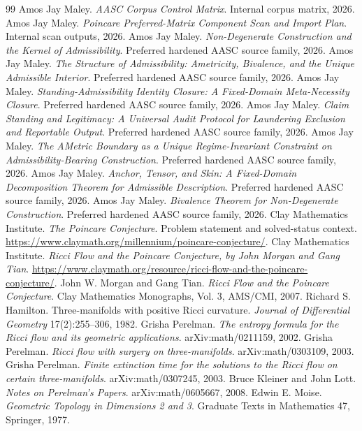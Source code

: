 \documentclass[11pt]{article}
\begin{document}
\begin{thebibliography}{99}
 Amos Jay Maley. \emph{AASC Corpus Control Matrix}. Internal corpus matrix, 2026.
 Amos Jay Maley. \emph{Poincare Preferred-Matrix Component Scan and Import Plan}. Internal scan outputs, 2026.
 Amos Jay Maley. \emph{Non-Degenerate Construction and the Kernel of Admissibility}. Preferred hardened AASC source family, 2026.
 Amos Jay Maley. \emph{The Structure of Admissibility: Ametricity, Bivalence, and the Unique Admissible Interior}. Preferred hardened AASC source family, 2026.
 Amos Jay Maley. \emph{Standing-Admissibility Identity Closure: A Fixed-Domain Meta-Necessity Closure}. Preferred hardened AASC source family, 2026.
 Amos Jay Maley. \emph{Claim Standing and Legitimacy: A Universal Audit Protocol for Laundering Exclusion and Reportable Output}. Preferred hardened AASC source family, 2026.
 Amos Jay Maley. \emph{The AMetric Boundary as a Unique Regime-Invariant Constraint on Admissibility-Bearing Construction}. Preferred hardened AASC source family, 2026.
 Amos Jay Maley. \emph{Anchor, Tensor, and Skin: A Fixed-Domain Decomposition Theorem for Admissible Description}. Preferred hardened AASC source family, 2026.
 Amos Jay Maley. \emph{Bivalence Theorem for Non-Degenerate Construction}. Preferred hardened AASC source family, 2026.
 Clay Mathematics Institute. \emph{The Poincare Conjecture}. Problem statement and solved-status context. \url{https://www.claymath.org/millennium/poincare-conjecture/}.
 Clay Mathematics Institute. \emph{Ricci Flow and the Poincare Conjecture, by John Morgan and Gang Tian}. \url{https://www.claymath.org/resource/ricci-flow-and-the-poincare-conjecture/}.
 John W. Morgan and Gang Tian. \emph{Ricci Flow and the Poincare Conjecture}. Clay Mathematics Monographs, Vol. 3, AMS/CMI, 2007.
 Richard S. Hamilton. Three-manifolds with positive Ricci curvature. \emph{Journal of Differential Geometry} 17(2):255--306, 1982.
 Grisha Perelman. \emph{The entropy formula for the Ricci flow and its geometric applications}. arXiv:math/0211159, 2002.
 Grisha Perelman. \emph{Ricci flow with surgery on three-manifolds}. arXiv:math/0303109, 2003.
 Grisha Perelman. \emph{Finite extinction time for the solutions to the Ricci flow on certain three-manifolds}. arXiv:math/0307245, 2003.
 Bruce Kleiner and John Lott. \emph{Notes on Perelman's Papers}. arXiv:math/0605667, 2008.
 Edwin E. Moise. \emph{Geometric Topology in Dimensions 2 and 3}. Graduate Texts in Mathematics 47, Springer, 1977.


\end{thebibliography}
\end{document}
